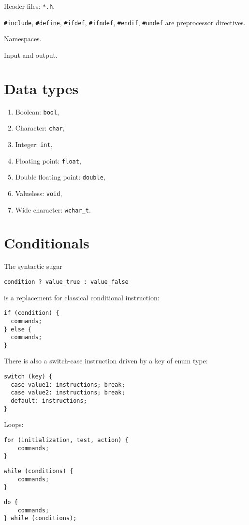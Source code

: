 \documentclass{programmingnotes}
\begin{document}
\renewcommand{\footrulewidth}{0.4pt}
\begin{multicols*}{3}

Header files: \texttt{*.h}.

\texttt{#include}, \texttt{#define}, \texttt{#ifdef}, \texttt{#ifndef}, \texttt{#endif}, \texttt{#undef} are preprocessor directives.

Namespaces.

Input and output.

\section{Data types}
\begin{enumerate}
\item Boolean: \texttt{bool}, 
\item Character: \texttt{char}, 
\item Integer: \texttt{int}, 
\item Floating point: \texttt{float}, 
\item Double floating point: \texttt{double}, 
\item Valueless: \texttt{void}, 
\item Wide character: \texttt{wchar\_t}.
\end{enumerate}

\section{Conditionals}
The syntactic sugar
\begin{verbatim}
condition ? value_true : value_false
\end{verbatim}
is a replacement for classical conditional instruction:
\begin{verbatim}
if (condition) {
  commands;
} else {
  commands;
}
\end{verbatim}

There is also a switch-case instruction driven by a key of enum type:
\begin{verbatim}
switch (key) {
  case value1: instructions; break;
  case value2: instructions; break;
  default: instructions;
}
\end{verbatim}

Loops:

\begin{verbatim}
for (initialization, test, action) {
	commands;
}
\end{verbatim}

\begin{verbatim}
while (conditions) {
	commands;
}
\end{verbatim}

\begin{verbatim}
do {
	commands;
} while (conditions);
\end{verbatim}

\end{multicols*}
\end{document}
